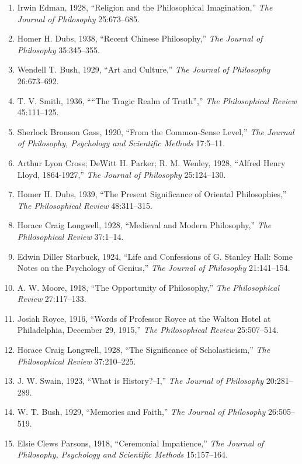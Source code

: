 \documentclass[
]{article}
\begin{document}
\begin{enumerate}
\def\labelenumi{\arabic{enumi}.}
\item
  Irwin Edman, 1928, ``Religion and the Philosophical Imagination,''
  \emph{The Journal of Philosophy} 25:673--685.
\item
  Homer H. Dubs, 1938, ``Recent Chinese Philosophy,'' \emph{The Journal
  of Philosophy} 35:345--355.
\item
  Wendell T. Bush, 1929, ``Art and Culture,'' \emph{The Journal of
  Philosophy} 26:673--692.
\item
  T. V. Smith, 1936, ````The Tragic Realm of Truth'','' \emph{The
  Philosophical Review} 45:111--125.
\item
  Sherlock Bronson Gass, 1920, ``From the Common-Sense Level,''
  \emph{The Journal of Philosophy, Psychology and Scientific Methods}
  17:5--11.
\item
  Arthur Lyon Cross; DeWitt H. Parker; R. M. Wenley, 1928, ``Alfred
  Henry Lloyd, 1864-1927,'' \emph{The Journal of Philosophy}
  25:124--130.
\item
  Homer H. Dubs, 1939, ``The Present Significance of Oriental
  Philosophies,'' \emph{The Philosophical Review} 48:311--315.
\item
  Horace Craig Longwell, 1928, ``Medieval and Modern Philosophy,''
  \emph{The Philosophical Review} 37:1--14.
\item
  Edwin Diller Starbuck, 1924, ``Life and Confessions of G. Stanley
  Hall: Some Notes on the Psychology of Genius,'' \emph{The Journal of
  Philosophy} 21:141--154.
\item
  A. W. Moore, 1918, ``The Opportunity of Philosophy,'' \emph{The
  Philosophical Review} 27:117--133.
\item
  Josiah Royce, 1916, ``Words of Professor Royce at the Walton Hotel at
  Philadelphia, December 29, 1915,'' \emph{The Philosophical Review}
  25:507--514.
\item
  Horace Craig Longwell, 1928, ``The Significance of Scholasticism,''
  \emph{The Philosophical Review} 37:210--225.
\item
  J. W. Swain, 1923, ``What is History?--I,'' \emph{The Journal of
  Philosophy} 20:281--289.
\item
  W. T. Bush, 1929, ``Memories and Faith,'' \emph{The Journal of
  Philosophy} 26:505--519.
\item
  Elsie Clews Parsons, 1918, ``Ceremonial Impatience,'' \emph{The
  Journal of Philosophy, Psychology and Scientific Methods} 15:157--164.
\end{enumerate}
\end{document}
